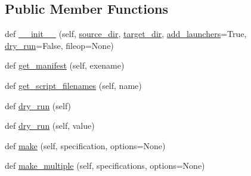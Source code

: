 \subsection*{Public Member Functions}
\begin{DoxyCompactItemize}
\item 
def \hyperlink{classpip_1_1__vendor_1_1distlib_1_1scripts_1_1ScriptMaker_a93ddbf5e1f7f81d54c46f7d77afce482}{\+\_\+\+\_\+init\+\_\+\+\_\+} (self, \hyperlink{classpip_1_1__vendor_1_1distlib_1_1scripts_1_1ScriptMaker_a0764d3545df8f0f6fc799e7b74288f2d}{source\+\_\+dir}, \hyperlink{classpip_1_1__vendor_1_1distlib_1_1scripts_1_1ScriptMaker_a3d4b4faf9a08c77dacf2bcd864440387}{target\+\_\+dir}, \hyperlink{classpip_1_1__vendor_1_1distlib_1_1scripts_1_1ScriptMaker_add5715f7decd6425a02008bf4350a865}{add\+\_\+launchers}=True, \hyperlink{classpip_1_1__vendor_1_1distlib_1_1scripts_1_1ScriptMaker_ab788624a4b1688e66c95f02b42674a4f}{dry\+\_\+run}=False, fileop=None)
\item 
def \hyperlink{classpip_1_1__vendor_1_1distlib_1_1scripts_1_1ScriptMaker_a6f1383c6e00510ba06d8bc2432960a87}{get\+\_\+manifest} (self, exename)
\item 
def \hyperlink{classpip_1_1__vendor_1_1distlib_1_1scripts_1_1ScriptMaker_a23c52f3a31ea8a40e6248c2c0fc6a705}{get\+\_\+script\+\_\+filenames} (self, name)
\item 
def \hyperlink{classpip_1_1__vendor_1_1distlib_1_1scripts_1_1ScriptMaker_ab788624a4b1688e66c95f02b42674a4f}{dry\+\_\+run} (self)
\item 
def \hyperlink{classpip_1_1__vendor_1_1distlib_1_1scripts_1_1ScriptMaker_ab1880b127b679f839b1596d1aa04bee2}{dry\+\_\+run} (self, value)
\item 
def \hyperlink{classpip_1_1__vendor_1_1distlib_1_1scripts_1_1ScriptMaker_ac7f4e0644f67141ddc2304e838e64f9e}{make} (self, specification, options=None)
\item 
def \hyperlink{classpip_1_1__vendor_1_1distlib_1_1scripts_1_1ScriptMaker_a47608296ced96eea37c55384a23e6f93}{make\+\_\+multiple} (self, specifications, options=None)
\end{DoxyCompactItemize}
